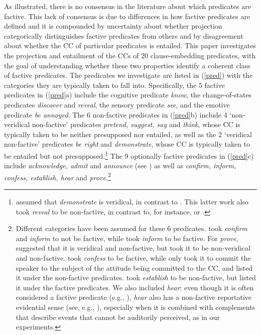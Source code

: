\documentclass[11pt,fleqn]{article}
\newcommand{\6}{\mbox{$[\hspace*{-.6mm}[$}}
\newcommand{\9}{\mbox{$]\hspace*{-.6mm}]$}}
\begin{document}
As illustrated, there is no consensus in the literature about which predicates are factive. This lack of consensus is due to differences in how factive predicates are defined and it is compounded by uncertainty about whether projection categorically distinguishes factive predicates from others and by disagreement about whether the CC of particular predicates is entailed. This paper investigates the projection and entailment of the CCs of 20 clause-embedding predicates, with the goal of understanding whether these two properties identify a coherent class of factive predicates. The predicates we investigate are listed in (\ref{pred}) with the categories they are typically taken to fall into. Specifically, the 5 factive predicates in (\ref{pred}a) include the cognitive predicate {\em know}, the change-of-states predicates {\em discover} and {\em reveal}, the sensory predicate {\em see}, and the emotive predicate {\em be annoyed}. The 6 non-factive predicates in (\ref{pred}b) include 4 `non-veridical non-factive' predicates {\em pretend, suggest, say} and {\em think}, whose CC is typically taken to be neither presupposed nor entailed, as well as  the 2 `veridical non-factive' predicates {\em be right} and {\em demonstrate}, whose CC is typically taken to be entailed but not presupposed.\footnote{\citet{anand-hacquard2014} assumed that {\em demonstrate} is veridical, in contrast to \citealt{anand-etal2019}. This latter work also took {\em reveal} to be non-factive, in contrast to, for instance, \citealt{egre2008,wyse} or \citealt{tbd-variability}.}  The 9 optionally factive predicates in (\ref{pred}c) include {\em acknowledge, admit} and {\em announce} (see \citealt{kiparsky-kiparsky70}) as well as {\em confirm, inform, confess, establish, hear} and {\em prove}.\footnote{Different categories have been assumed for these 6 predicates. \citet{anand-hacquard2014} took {\em confirm} and {\em inform}  to not be factive, while \citet{schlenker10} took {\em inform} to be factive. For {\em prove}, \citet{white-rawlins-nels2018} suggested that it is veridical and non-factive, but \citet{anand-hacquard2014} took it to be non-veridical and non-factive. \citet{swanson2012}  took {\em confess} to be factive, while \citet{karttunen2016} only took it to commit the speaker to the subject of the attitude being committed to the CC, and \citet{wyse} listed it under the non-factive predicates. \citet{swanson2012} took  {\em establish} to be non-factive, but \citet{wyse} listed it under the factive predicates. We also included {\em hear}: even though it is often considered a factive predicate (e.g., \citealt{beaver-belly,anand-hacquard2014}), {\em hear} also has a non-factive reportative evidential sense (see, e.g., \citealt{anderson86,simons07}), especially when it is combined with complements that describe events that cannot be auditorily perceived, as in our experiments.}
\end{document}
